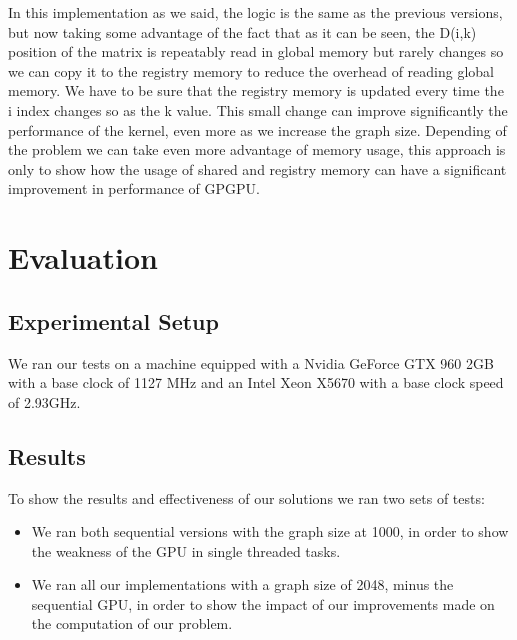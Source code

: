 \documentclass[conference]{IEEEtran}
\begin{document}
In this implementation as we said, the logic is the same as the previous versions, but now taking some advantage of the fact that as it can be seen, the D(i,k) position of the matrix is repeatably read in global memory but rarely changes so we can copy it to the registry memory to reduce the overhead of reading global memory. We have to be sure that the registry memory is updated every time the i index changes so as the k value. This small change can improve significantly the performance of the kernel, even more as we increase the graph size. Depending of the problem we can take even more advantage of memory usage, this approach is only to show how the usage of shared and registry memory can have a significant improvement in performance of GPGPU.

\section{Evaluation}

\subsection{Experimental Setup}

We ran our tests on a machine equipped with a Nvidia GeForce GTX 960 2GB with a base clock of 1127 MHz and an Intel Xeon X5670 with a base clock speed of 2.93GHz.

\subsection{Results}

To show the results and effectiveness of our solutions we ran two sets of tests:
\begin{itemize}
	\item We ran both sequential versions with the graph size at 1000, in order to show the weakness of the GPU in single threaded tasks.
	\item We ran all our implementations with a graph size of 2048, minus the sequential GPU, in order to show the impact of our improvements made on the computation of our problem.
\end{itemize}
\end{document}
